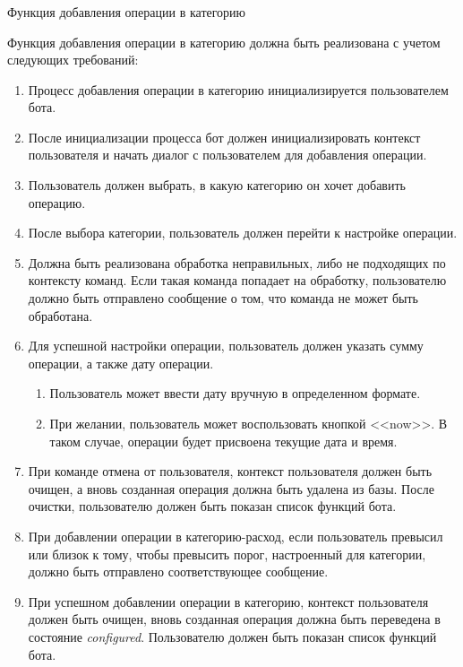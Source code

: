 \subsubsection{} Функция добавления операции в категорию
\label{sec:domain:specification:addoperationtocategory}

Функция добавления операции в категорию должна быть реализована с учетом следующих требований:

\begin{enumerate}
	\item Процесс добавления операции в категорию инициализируется пользователем бота.
	\item После инициализации процесса бот должен инициализировать контекст пользователя и начать диалог с пользователем для добавления операции.
	\item Пользователь должен выбрать, в какую категорию он хочет добавить операцию.
	\item После выбора категории, пользователь должен перейти к настройке операции.
	\item Должна быть реализована обработка неправильных, либо не подходящих по контексту команд. Если такая команда попадает на обработку, пользователю должно быть отправлено сообщение о том, что команда не может быть обработана.
	\item Для успешной настройки операции, пользователь должен указать сумму операции, а также дату операции.
	\begin{enumerate}
		\item Пользователь может ввести дату вручную в определенном формате.
		\item При желании, пользователь может воспользовать кнопкой <<now>>. В таком случае, операции будет присвоена текущие дата и время.
	\end{enumerate}
	\item При команде отмена от пользователя, контекст пользователя должен быть очищен, а вновь созданная операция должна быть удалена из базы. После очистки, пользователю должен быть показан список функций бота.
	\item При добавлении операции в категорию-расход, если пользователь превысил или близок к тому, чтобы превысить порог, настроенный для категории, должно быть отправлено соответствующее сообщение.
	\item При успешном добавлении операции в категорию, контекст пользователя должен быть очищен, вновь созданная операция должна быть переведена в состояние \emph{configured}. Пользователю должен быть показан список функций бота.
\end{enumerate}

